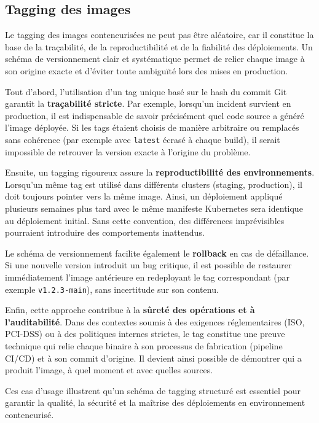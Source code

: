 \subsection{Tagging des images}

Le tagging des images conteneurisées ne peut pas être aléatoire, car il constitue la base de la traçabilité, de la reproductibilité et de la fiabilité des déploiements. Un schéma de versionnement clair et systématique permet de relier chaque image à son origine exacte et d'éviter toute ambiguïté lors des mises en production.

Tout d'abord, l'utilisation d'un tag unique basé sur le hash du commit Git garantit la \textbf{traçabilité stricte}. Par exemple, lorsqu'un incident survient en production, il est indispensable de savoir précisément quel code source a généré l'image déployée. Si les tags étaient choisis de manière arbitraire ou remplacés sans cohérence (par exemple avec \texttt{latest} écrasé à chaque build), il serait impossible de retrouver la version exacte à l'origine du problème.

Ensuite, un tagging rigoureux assure la \textbf{reproductibilité des environnements}. Lorsqu'un même tag est utilisé dans différents clusters (staging, production), il doit toujours pointer vers la même image. Ainsi, un déploiement appliqué plusieurs semaines plus tard avec le même manifeste Kubernetes sera identique au déploiement initial. Sans cette convention, des différences imprévisibles pourraient introduire des comportements inattendus.

Le schéma de versionnement facilite également le \textbf{rollback} en cas de défaillance. Si une nouvelle version introduit un bug critique, il est possible de restaurer immédiatement l'image antérieure en redeployant le tag correspondant (par exemple \texttt{v1.2.3-main}), sans incertitude sur son contenu.

Enfin, cette approche contribue à la \textbf{sûreté des opérations et à l'auditabilité}. Dans des contextes soumis à des exigences réglementaires (ISO, PCI-DSS) ou à des politiques internes strictes, le tag constitue une preuve technique qui relie chaque binaire à son processus de fabrication (pipeline CI/CD) et à son commit d'origine. Il devient ainsi possible de démontrer qui a produit l'image, à quel moment et avec quelles sources.

Ces cas d'usage illustrent qu'un schéma de tagging structuré est essentiel pour garantir la qualité, la sécurité et la maîtrise des déploiements en environnement conteneurisé.


